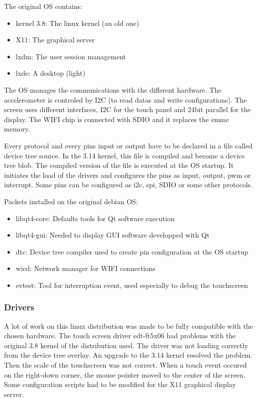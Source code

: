 The original OS contains:
\begin{itemize}
\item{kernel 3.8: The linux kernel (an old one)}
\item{X11: The graphical server}
\item{lxdm: The user session management}
\item{lxde: A desktop (light)}
\end{itemize}

The OS manages the communications with the different hardware. The accelerometer is controled by I2C (to read datas and write configurations). The screen uses different interfaces, I2C for the touch panel and 24bit parallel for the display. The WIFI chip is connected with SDIO and it replaces the emmc memory.

Every protocol and every pins input or output have to be declared in a file called device tree source. In the 3.14 kernel, this file is compiled and become a device tree blob. The compiled version of the file is executed at the OS startup. It initiates the load of the drivers and configures the pins as input, output, pwm or interrupt. Some pins can be configured as i2c, spi, SDIO or some other protocols.


Packets installed on the original debian OS:
\begin{itemize}
\item{libqt4-core: Defaults tools for Qt software execution}
\item{libqt4-gui: Needed to display GUI software developped with Qt}
\item{dtc: Device tree compiler used to create pin configuration at the OS startup}
\item{wicd: Network manager for WIFI connections}
\item{evtest: Tool for interruption event, used especially to debug the touchscreen}
\end{itemize}


\subsubsection{Drivers}
A lot of work on this linux distribution was made to be fully compatible with the chosen hardware.
The touch screen driver edt-ft5x06 had problems with the original 3.8 kernel of the distribution used. The driver was not loading correctly from the device tree overlay. An upgrade to the 3.14 kernel resolved the problem.
Then the scale of the touchscreen was not correct. 
When a touch event occured on the right-down corner, the mouse pointer moved to the center of the screen. Some configuration scripts had to be modified for the X11 graphical display server.

